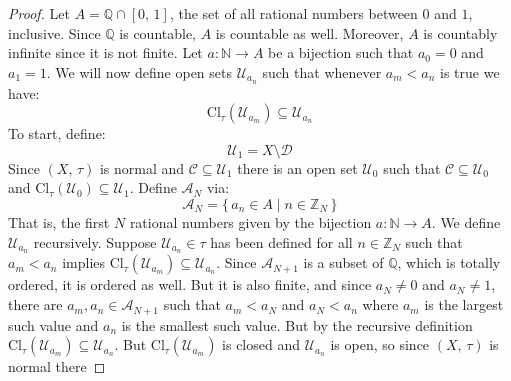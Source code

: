 \documentclass{article}
\theoremstyle{plain}
\begin{document}
        \begin{proof}
            Let $A=\mathbb{Q}\cap[0,\,1]$, the set of all rational numbers
            between $0$ and $1$, inclusive. Since $\mathbb{Q}$ is countable,
            $A$ is countable as well. Moreover, $A$ is countably infinite since
            it is not finite. Let $a:\mathbb{N}\rightarrow{A}$ be a bijection
            such that $a_{0}=0$ and $a_{1}=1$. We will now define open sets
            $\mathcal{U}_{a_{n}}$ such that whenever $a_{m}<a_{n}$ is true
            we have:
            \begin{equation}
                \textrm{Cl}_{\tau}(\mathcal{U}_{a_{m}})
                \subseteq\mathcal{U}_{a_{n}}
            \end{equation}
            To start, define:
            \begin{equation}
                \mathcal{U}_{1}=X\setminus\mathcal{D}
            \end{equation}
            Since $(X,\,\tau)$ is normal and
            $\mathcal{C}\subseteq\mathcal{U}_{1}$ there is an open
            set $\mathcal{U}_{0}$ such that
            $\mathcal{C}\subseteq\mathcal{U}_{0}$ and
            $\textrm{Cl}_{\tau}(\mathcal{U}_{0})\subseteq\mathcal{U}_{1}$.
            Define $\mathcal{A}_{N}$ via:
            \begin{equation}
                \mathcal{A}_{N}=\{\,a_{n}\in{A}\;|\;n\in\mathbb{Z}_{N}\,\}
            \end{equation}
            That is, the first $N$ rational numbers given by the bijection
            $a:\mathbb{N}\rightarrow{A}$. We define $\mathcal{U}_{a_{n}}$
            recursively. Suppose $\mathcal{U}_{a_{n}}\in\tau$ has been defined
            for all $n\in\mathbb{Z}_{N}$ such that $a_{m}<a_{n}$ implies
            $\textrm{Cl}_{\tau}(\mathcal{U}_{a_{m}})\subseteq\mathcal{U}_{a_{n}}$.
            Since $\mathcal{A}_{N+1}$ is a subset of $\mathbb{Q}$, which is
            totally ordered, it is ordered as well. But it is also finite, and
            since $a_{N}\ne{0}$ and $a_{N}\ne{1}$, there are
            $a_{m},a_{n}\in\mathcal{A}_{N+1}$ such that
            $a_{m}<a_{N}$ and $a_{N}<a_{n}$ where $a_{m}$ is the largest
            such value and $a_{n}$ is the smallest such value. But by the
            recursive definition
            $\textrm{Cl}_{\tau}(\mathcal{U}_{a_{m}})\subseteq\mathcal{U}_{a_{n}}$.
            But $\textrm{Cl}_{\tau}(\mathcal{U}_{a_{m}})$ is closed and
            $\mathcal{U}_{a_{n}}$ is open, so since $(X,\,\tau)$ is normal there

\end{proof}
\end{document}

